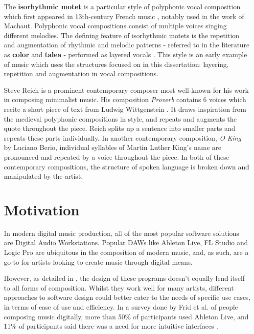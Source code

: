 \documentclass[12pt,a4paper,oneside,openright]{report}
\begin{document}
The \textbf{isorhythmic motet} is a particular style of polyphonic vocal composition which first appeared in 13th-century French music \cite{Bent01}, notably used in the work of Machaut. Polyphonic vocal compositions consist of multiple voices singing different melodies. The defining feature of isorhythmic motets is the repetition and augmentation of rhythmic and melodic patterns - referred to in the literature as \textbf{color} and \textbf{talea} - performed as layered vocals \cite{Turner91}. This style is an early example of music which uses the structures focused on in this dissertation: layering, repetition and augmentation in vocal compositions.

Steve Reich is a prominent contemporary composer most well-known for his work in composing minimalist music. His composition \textit{Proverb} contains 6 voices which recite a short piece of text from Ludwig Wittgenstein \cite{ReichProverb}. It draws inspiration from the medieval polyphonic compositions in style, and repeats and augments the quote throughout the piece. Reich splits up a sentence into smaller parts and repeats these parts individually. In another contemporary composition, \textit{O King} by Luciano Berio, individual syllables of Martin Luther King's name are pronounced and repeated by a voice throughout the piece. In both of these contemporary compositions, the structure of spoken language is broken down and manipulated by the artist.

\section{Motivation}\label{sec:motivation}
In modern digital music production, all of the most popular software solutions are Digital Audio Workstations. Popular DAWs like Ableton Live, FL Studio and Logic Pro are ubiquitous in the composition of modern music, and, as such, are a go-to for artists looking to create music through digital means.

However, as detailed in , the design of these programs doesn't equally lend itself to all forms of composition. Whilst they work well for many artists, different approaches to software design could better cater to the needs of specific use cases, in terms of ease of use and efficiency. In a survey done by Frid et al. of people composing music digitally, more than 50\% of participants used Ableton Live, and 11\% of participants said there was a need for more intuitive interfaces \cite{Frid21}. 
\end{document}
